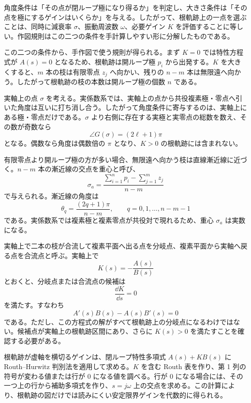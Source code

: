 角度条件は「その点が閉ループ極になり得るか」を判定し、大きさ条件は「その点を極にするゲインはいくらか」を与える。したがって、根軌跡上の一点を選ぶことは、同時に減衰率 $\sigma$、振動周波数 $\omega$、必要ゲイン $K$ を評価することに等しい。作図規則はこの二つの条件を手計算しやすい形に分解したものである。

この二つの条件から、手作図で使う規則が得られる。まず $K=0$ では特性方程式が $A(s)=0$ となるため、根軌跡は開ループ極 $p_i$ から出発する。$K$ を大きくすると、$m$ 本の枝は有限零点 $z_j$ へ向かい、残りの $n-m$ 本は無限遠へ向かう。したがって根軌跡の枝の本数は開ループ極の個数 $n$ である。

実軸上の点 $\sigma$ を考える。実係数系では、実軸上の点から共役複素極・零点へ引いた角度は互いに打ち消し合う。したがって角度条件に寄与するのは、実軸上にある極・零点だけである。$\sigma$ より右側に存在する実極と実零点の総数を数え、その数が奇数なら
\begin{equation}
  \angle G(\sigma)=(2\ell+1)\pi
\end{equation}
となる。偶数なら角度は偶数倍の $\pi$ となり、$K>0$ の根軌跡には含まれない。

有限零点より開ループ極の方が多い場合、無限遠へ向かう枝は直線漸近線に近づく。$n-m$ 本の漸近線の交点を重心と呼び、
\begin{equation}
  \sigma_a=
  \frac{\sum_{i=1}^{n}p_i-\sum_{j=1}^{m}z_j}{n-m}
\end{equation}
で与えられる。漸近線の角度は
\begin{equation}
  \theta_q=\frac{(2q+1)\pi}{n-m},
  \qquad q=0,1,\ldots,n-m-1
\end{equation}
である。実係数系では複素極と複素零点が共役対で現れるため、重心 $\sigma_a$ は実数になる。

実軸上で二本の枝が合流して複素平面へ出る点を分岐点、複素平面から実軸へ戻る点を合流点と呼ぶ。実軸上で
\begin{equation}
  K(s)=-\frac{A(s)}{B(s)}
\end{equation}
とおくと、分岐点または合流点の候補は
\begin{equation}
  \frac{\dd K}{\dd s}=0
\end{equation}
を満たす。すなわち
\begin{equation}
  A'(s)B(s)-A(s)B'(s)=0
\end{equation}
である。ただし、この方程式の解がすべて根軌跡上の分岐点になるわけではない。候補点が実軸上の根軌跡区間にあり、さらに $K(s)>0$ を満たすことを確認する必要がある。

根軌跡が虚軸を横切るゲインは、閉ループ特性多項式 $A(s)+KB(s)$ に Routh--Hurwitz 判別法を適用して求める。$K$ を含む Routh 表を作り、第 1 列の符号が変わる値または行が 0 になる値を調べる。行が 0 になる場合には、その一つ上の行から補助多項式を作り、$s=j\omega$ 上の交点を求める。この計算により、根軌跡の図だけでは読みにくい安定限界ゲインを代数的に得られる。

